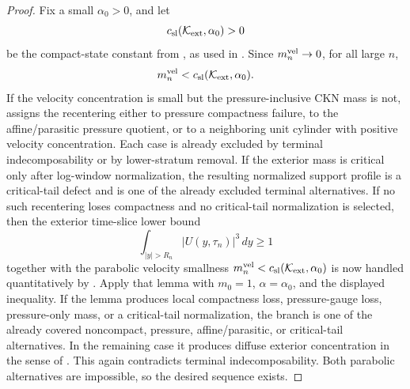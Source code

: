 \documentclass[11pt]{amsart}
\numberwithin{equation}{section}
\theoremstyle{plain}
\theoremstyle{definition}
\theoremstyle{remark}
\newcommand{\calK}{\mathcal K}
\begin{document}
\begin{proof}
Fix a small \(\alpha_0>0\), and let
\[
   c_{\rm sl}(\calK_{\rm ext},\alpha_0)>0
\]
be the compact-state constant from , as
used in .  Since
\(m_n^{\rm vel}\to0\), for all large \(n\),
\[
   m_n^{\rm vel}<c_{\rm sl}(\calK_{\rm ext},\alpha_0).
\]
If the
velocity concentration is small but the pressure-inclusive CKN mass is not,
 assigns the recentering either to
pressure compactness failure, to the affine/parasitic pressure quotient, or to
a neighboring unit cylinder with positive velocity concentration.  Each case is
already excluded by terminal indecomposability or by lower-stratum removal.  If the
exterior mass is critical only after log-window normalization, the resulting
normalized support profile is a critical-tail defect and is one of the already excluded
terminal alternatives.  If no such recentering loses compactness and no
critical-tail normalization is selected, then the exterior time-slice lower bound
\[
   \int_{|y|>R_n}|U(y,\tau_n)|^3\,dy\ge1
\]
together with the parabolic velocity smallness
\(m_n^{\rm vel}<c_{\rm sl}(\calK_{\rm ext},\alpha_0)\)
is now
handled quantitatively by .  Apply
that lemma with \(m_0=1\), \(\alpha=\alpha_0\), and the displayed inequality.
If the lemma produces local compactness loss, pressure-gauge loss, pressure-only
mass, or a critical-tail normalization, the branch is one of the already covered
noncompact, pressure, affine/parasitic, or critical-tail alternatives.  In the
remaining case it produces diffuse exterior concentration in the sense of
.  This again contradicts terminal
indecomposability.  Both parabolic alternatives are impossible, so the desired
sequence exists.
\end{proof}
\end{document}
